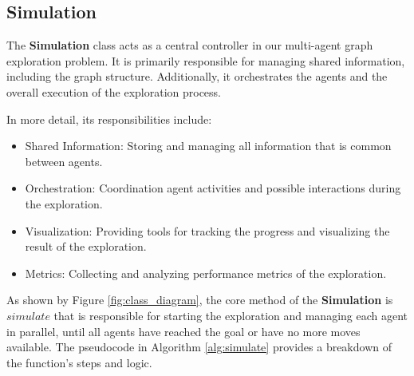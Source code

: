\subsection{Simulation}
\label{section_modeling_simulation}

The \textbf{Simulation} class acts as a central controller in our multi-agent
graph exploration problem. It is primarily responsible for managing shared information, including the graph structure.
Additionally, it orchestrates the agents and the overall execution of the exploration process.

In more detail, its responsibilities include:

\begin{itemize}
    \item Shared Information: Storing and managing all information that is common between agents.
    \item Orchestration: Coordination agent activities and possible interactions during the exploration.
    \item Visualization: Providing tools for tracking the progress and visualizing the result of the exploration.
    \item Metrics: Collecting and analyzing performance metrics of the exploration.
\end{itemize}

As shown by Figure \ref{fig:class_diagram}, the core method of the \textbf{Simulation} is $simulate$ that is responsible for starting the exploration and managing each agent
in parallel, until all agents have reached the goal or have no more moves available.
The pseudocode in Algorithm \ref{alg:simulate} provides a breakdown of the function's steps and logic.

